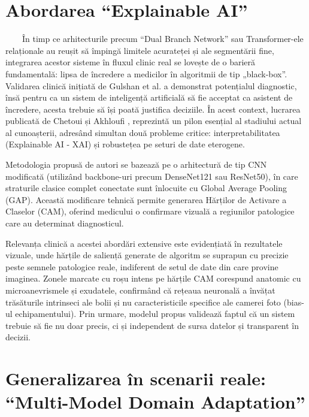 \documentclass[12pt, a4paper, twoside, romanian]{teza-upb}
\begin{document}
\section{Abordarea “Explainable AI” \cite{9_chetoui2020explainable}}

\ \ \ \ În timp ce arhitecturile precum “Dual Branch Network” \cite{11_shakibania2024dual} sau Transformer-ele relaționale
\cite{7_huang2022rtnet}
au reușit să împingă limitele acurateței și ale segmentării fine, integrarea acestor sisteme în fluxul clinic
real se lovește de o barieră fundamentală: lipsa de încredere a medicilor
în algoritmii de tip „black-box”.
Validarea clinică inițiată de Gulshan et al. \cite{3_gulshan2016development} a demonstrat potențialul diagnostic, însă pentru ca un
sistem de inteligență artificială să fie acceptat ca asistent de încredere, acesta trebuie să își poată
justifica deciziile. În acest context, lucrarea publicată de Chetoui și Akhloufi \cite{9_chetoui2020explainable}, reprezintă un pilon
esențial al stadiului actual al cunoașterii, adresând simultan două probleme critice: interpretabilitatea
(Explainable AI - XAI) și robustețea pe seturi de date eterogene.
\bigskip

Metodologia propusă de autori se bazează pe o arhitectură de tip CNN modificată (utilizând
backbone-uri precum DenseNet121 sau ResNet50), în care straturile clasice complet conectate sunt
înlocuite cu Global Average Pooling (GAP). Această modificare tehnică permite generarea Hărților de
Activare a Claselor (CAM), oferind medicului o confirmare vizuală a regiunilor patologice care au
determinat diagnosticul.
\bigskip

Relevanța clinică a acestei abordări extensive este evidențiată în rezultatele vizuale, unde hărțile
de saliență generate de algoritm se suprapun cu precizie peste semnele patologice reale, indiferent de
setul de date din care provine imaginea. Zonele marcate cu roșu intens pe hărțile CAM corespund
anatomic cu microanevrismele și exudatele, confirmând că rețeaua neuronală a învățat trăsăturile
intrinseci ale bolii și nu caracteristicile specifice ale camerei foto (bias-ul echipamentului). Prin urmare,
modelul propus \cite{9_chetoui2020explainable} validează faptul că un sistem trebuie să fie nu
doar precis, ci și independent de sursa
datelor și transparent în decizii.

\section{Generalizarea în scenarii reale: “Multi-Model Domain Adaptation” \cite{8_zhang2022multi}}
\end{document}
